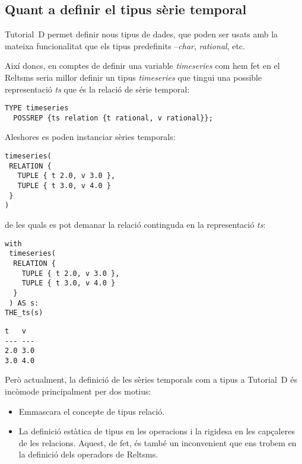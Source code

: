 \subsection{Quant a definir el tipus sèrie temporal}
\label{sec:implementacio:tipus-relacional}




Tutorial~D permet definir nous tipus de dades, que poden ser usats amb
la mateixa funcionalitat que els tipus predefinits --\emph{char},
\emph{rational}, etc.  

Així doncs, en comptes de definir una variable \emph{timeseries} com
hem fet en el Reltsms seria millor definir un tipus \emph{timeseries}
que tingui una possible representació \emph{ts} que és la relació de
sèrie temporal:
\begin{lstlisting}[style=tutorialD]
TYPE timeseries
  POSSREP {ts relation {t rational, v rational}};
\end{lstlisting}


Aleshores es poden instanciar sèries temporals:
\begin{lstlisting}[style=tutorialD]
timeseries(
 RELATION {
   TUPLE { t 2.0, v 3.0 },
   TUPLE { t 3.0, v 4.0 }
 }
)
\end{lstlisting}

de les quals es pot demanar la relació continguda en la representació \emph{ts}:
\begin{lstlisting}[style=tutorialD]
with
 timeseries(
  RELATION {
    TUPLE { t 2.0, v 3.0 },
    TUPLE { t 3.0, v 4.0 }
  }
 ) AS s:
THE_ts(s)
\end{lstlisting}
\begin{lstlisting}[style=stdout]
 t   v 
--- ---
2.0 3.0
3.0 4.0
\end{lstlisting}


Però actualment, la definició de les sèries temporals com a tipus a
Tutorial~D és incòmode principalment per dos motius:
\begin{itemize}
\item Emmascara el concepte de tipus relació.

\item La definició estàtica de tipus en les operacions i la rigidesa
  en les capçaleres de les relacions. Aquest, de fet, és també un
  inconvenient que ens trobem en la definició dels operadors de
  Reltsms.
\end{itemize}



